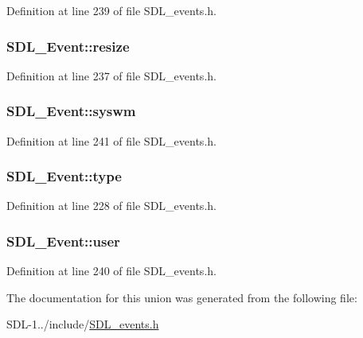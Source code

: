 Definition at line 239 of file S\+D\+L\+\_\+events.\+h.

\hypertarget{union_s_d_l___event_a6e82d8628b9402aaa7660ebf0162228a}{}
\subsubsection[{resize}]{ S\+D\+L\+\_\+\+Event\+::resize}\label{union_s_d_l___event_a6e82d8628b9402aaa7660ebf0162228a}


Definition at line 237 of file S\+D\+L\+\_\+events.\+h.

\hypertarget{union_s_d_l___event_ab3b2eaf5348d4c50a51b1f297fdef537}{}
\subsubsection[{syswm}]{ S\+D\+L\+\_\+\+Event\+::syswm}\label{union_s_d_l___event_ab3b2eaf5348d4c50a51b1f297fdef537}


Definition at line 241 of file S\+D\+L\+\_\+events.\+h.

\hypertarget{union_s_d_l___event_a166d8d0350220f28bef35a7b4a8c6900}{}
\subsubsection[{type}]{ S\+D\+L\+\_\+\+Event\+::type}\label{union_s_d_l___event_a166d8d0350220f28bef35a7b4a8c6900}


Definition at line 228 of file S\+D\+L\+\_\+events.\+h.

\hypertarget{union_s_d_l___event_ab7c394e3ce7bf1e4f8d68bc0e9f1b042}{}
\subsubsection[{user}]{ S\+D\+L\+\_\+\+Event\+::user}\label{union_s_d_l___event_ab7c394e3ce7bf1e4f8d68bc0e9f1b042}


Definition at line 240 of file S\+D\+L\+\_\+events.\+h.



The documentation for this union was generated from the following file\+:\begin{DoxyCompactItemize}
\item 
S\+D\+L-\/1../include/\hyperlink{_s_d_l__events_8h}{S\+D\+L\+\_\+events.\+h}\end{DoxyCompactItemize}
